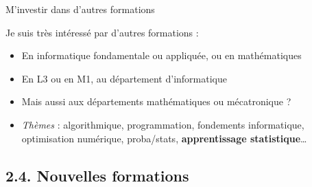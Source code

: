 \documentclass[11pt,english,ignorenonframetext,]{beamer}
\providecommand{\tightlist}{%
  \setlength{\itemsep}{0pt}\setlength{\parskip}{0pt}}
\begin{document}
\begin{frame}{M'investir dans d'autres formations}

\pause


  Je suis très intéressé par d'autres formations :

  \begin{itemize}
  \item
    \textcolor{info}{En informatique fondamentale ou appliquée},
    ou \textcolor{maths}{en mathématiques}
  \vspace*{15pt}
  \item
    En L3 ou en M1, \textcolor{info}{au département d'informatique}
  \vspace*{15pt}
  \item
    Mais aussi aux départements \textcolor{maths}{mathématiques} ou \textcolor{meca}{mécatronique} ?
  \vspace*{15pt}
  \item
    \emph{Thèmes} : algorithmique, programmation, fondements informatique,
    optimisation numérique, proba/stats, \textcolor{ml}{\textbf{apprentissage statistique}}\ldots
  \end{itemize}

\end{frame}


\subsection{\hfill{}2.4. Nouvelles formations\hfill{}}
\end{document}
